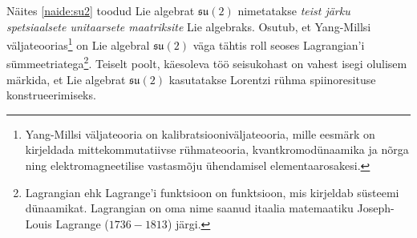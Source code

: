 \documentclass[12pt]{article}
\theoremstyle{plain}
\theoremstyle{definition}
\numberwithin{equation}{section}
\def\su2{{\mathfrak{ su}\left(2\right)}}
\begin{document}
Näites \ref{naide:su2} toodud Lie algebrat $\su2$ nimetatakse 
\emph{teist järku spetsiaalsete unitaarsete maatriksite} Lie 
algebraks. Osutub, et Yang-Millsi väljateoorias\footnote{Yang-Millsi 
väljateooria on kalibratsiooniväljateooria, mille eesmärk on 
kirjeldada mittekommutatiivse rühmateooria, kvantkromodünaamika ja 
nõrga ning elektromagneetilise vastasmõju ühendamisel 
elementaarosakesi.} on Lie algebral $\su2$ väga tähtis roll seoses 
Lagrangian'i sümmeetriatega\footnote{Lagrangian ehk Lagrange'i 
funktsioon on funktsioon, mis kirjeldab süsteemi dünaamikat. 
Lagrangian on oma nime saanud itaalia matemaatiku Joseph-Louis 
Lagrange ($1736 - 1813$) järgi.}. Teiselt poolt, käesoleva töö 
seisukohast on vahest isegi olulisem märkida, et Lie algebrat $\su2$ 
kasutatakse Lorentzi rühma spiinoresituse konstrueerimiseks.
\end{document}
